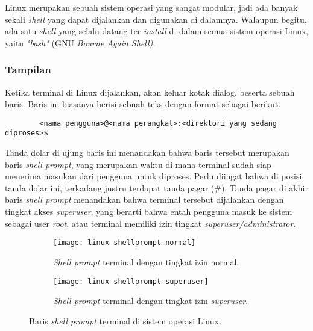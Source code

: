 Linux merupakan sebuah sistem operasi yang sangat modular, jadi ada banyak sekali \textit{shell} yang dapat dijalankan dan digunakan di dalamnya. Walaupun begitu, ada satu \textit{shell} yang selalu datang ter-\textit{install} di dalam semua sistem operasi Linux, yaitu \textit{"bash"} (GNU \textit{Bourne Again Shell).}\cite{matthew:2007:beginninglinuxprogramming}

\subsubsection{Tampilan}
\label{sec:commandline-linux-appearance}

Ketika terminal di Linux dijalankan, akan keluar kotak dialog, beserta sebuah baris. Baris ini biasanya berisi sebuah teks dengan format sebagai berikut.

\begin{verbatim}
        <nama pengguna>@<nama perangkat>:<direktori yang sedang diproses>$
\end{verbatim}

Tanda dolar di ujung baris ini menandakan bahwa baris tersebut merupakan baris \textit{shell prompt}, yang merupakan waktu di mana terminal sudah siap menerima masukan dari pengguna untuk diproses. Perlu diingat bahwa di posisi tanda dolar ini, terkadang justru terdapat tanda pagar (\#). Tanda pagar di akhir baris \textit{shell prompt} menandakan bahwa terminal tersebut dijalankan dengan tingkat akses \textit{superuser}, yang berarti bahwa entah pengguna masuk ke sistem sebagai user \textit{root}, atau terminal memiliki izin tingkat \textit{superuser/administrator}.\cite{shottsjr:2019:linuxcommandline}

\begin{figure}[ht]
    \begin{subfigure}[b]{0.475\linewidth}
		\centering
		\texttt{[image: linux-shellprompt-normal]}
		\caption{\textit{Shell prompt} terminal dengan tingkat izin \mbox{normal}.}
		\label{fig:shellprompt-linux-normal}
	\end{subfigure}
	\hfill
    \begin{subfigure}[b]{0.475\linewidth}
		\centering
		\texttt{[image: linux-shellprompt-superuser]}
		\caption{\textit{Shell prompt} terminal dengan tingkat izin \textit{\mbox{superuser}}.}
		\label{fig:shellprompt-linux-superuser}
	\end{subfigure}
    \caption{Baris \textit{shell prompt} terminal di sistem operasi Linux.}
	\label{fig:commandline-shellprompt-linux}
\end{figure}


